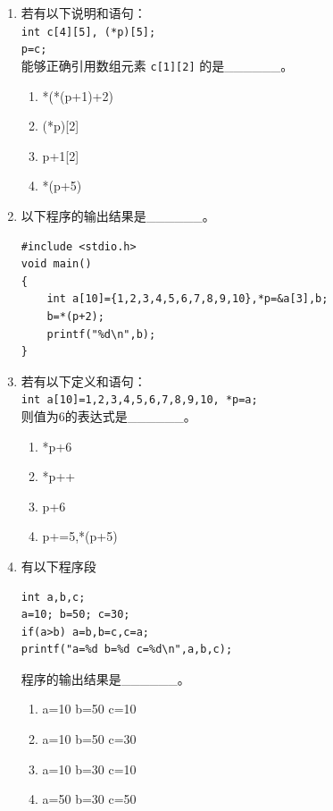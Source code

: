 \documentclass[a4paper,12pt]{article}
\begin{document}
\begin{enumerate}
	\item 若有以下说明和语句：\\
	      \texttt{int c[4][5], (*p)[5];}\\
	      \texttt{p=c;}\\
	      能够正确引用数组元素 \texttt{c[1][2]} 的是\_\_\_\_\_\_。
	      \begin{enumerate}
		      \item[A)] *(*(p+1)+2)
		      \item[B)] (*p)[2]
		      \item[C)] p+1[2]
		      \item[D)] *(p+5)
	      \end{enumerate}
	      \vspace{0.3cm}

	\item 以下程序的输出结果是\_\_\_\_\_\_。
	      \begin{verbatim}
#include <stdio.h>
void main()
{
    int a[10]={1,2,3,4,5,6,7,8,9,10},*p=&a[3],b;
    b=*(p+2);
    printf("%d\n",b);
}
    \end{verbatim}
	      \vspace{0.3cm}

	\item 若有以下定义和语句：\\
	      \texttt{int a[10]={1,2,3,4,5,6,7,8,9,10}, *p=a;}\\
	      则值为6的表达式是\_\_\_\_\_\_。
	      \begin{enumerate}
		      \item[A)] *p+6
		      \item[B)] *p++
		      \item[C)] p+6
		      \item[D)] p+=5,*(p+5)
	      \end{enumerate}
	      \vspace{0.3cm}

	\item 有以下程序段
	      \begin{verbatim}
int a,b,c;
a=10; b=50; c=30;
if(a>b) a=b,b=c,c=a;
printf("a=%d b=%d c=%d\n",a,b,c);
    \end{verbatim}
	      程序的输出结果是\_\_\_\_\_\_。
	      \begin{enumerate}
		      \item[A)] a=10 b=50 c=10
		      \item[B)] a=10 b=50 c=30
		      \item[C)] a=10 b=30 c=10
		      \item[D)] a=50 b=30 c=50
	      \end{enumerate}
	      \vspace{0.3cm}


\end{enumerate}
\end{document}
